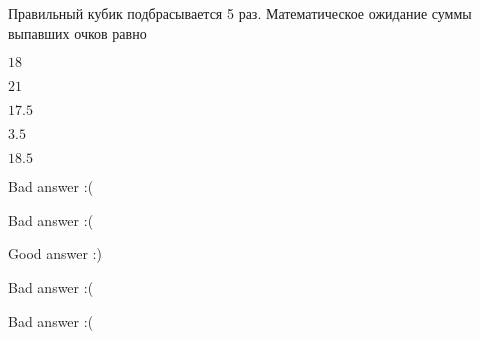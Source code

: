 
\begin{question}
Правильный кубик подбрасывается 5 раз. Математическое ожидание суммы
выпавших очков равно
\begin{answerlist}
  \item \(18\)
  \item \(21\)
  \item \(17.5\)
  \item \(3.5\)
  \item \(18.5\)
\end{answerlist}
\end{question}

\begin{solution}
\begin{answerlist}
  \item Bad answer :(
  \item Bad answer :(
  \item Good answer :)
  \item Bad answer :(
  \item Bad answer :(
\end{answerlist}
\end{solution}

